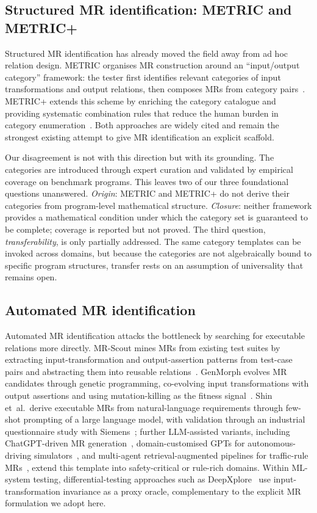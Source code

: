 \documentclass[acmsmall, screen]{acmart}
\begin{document}
\subsection{Structured MR identification: METRIC and METRIC+}

Structured MR identification has already moved the field away from ad hoc relation design. METRIC organises MR construction around an ``input/output category'' framework: the tester first identifies relevant categories of input transformations and output relations, then composes MRs from category pairs~\cite{ChenMETRIC2016}. METRIC+ extends this scheme by enriching the category catalogue and providing systematic combination rules that reduce the human burden in category enumeration~\cite{SunMETRICplus2021}. Both approaches are widely cited and remain the strongest existing attempt to give MR identification an explicit scaffold.

Our disagreement is not with this direction but with its grounding. The categories are introduced through expert curation and validated by empirical coverage on benchmark programs. This leaves two of our three foundational questions unanswered. \emph{Origin}: METRIC and METRIC+ do not derive their categories from program-level mathematical structure. \emph{Closure}: neither framework provides a mathematical condition under which the category set is guaranteed to be complete; coverage is reported but not proved. The third question, \emph{transferability}, is only partially addressed. The same category templates can be invoked across domains, but because the categories are not algebraically bound to specific program structures, transfer rests on an assumption of universality that remains open.

\subsection{Automated MR identification}

Automated MR identification attacks the bottleneck by searching for executable relations more directly. MR-Scout mines MRs from existing test suites by extracting input-transformation and output-assertion patterns from test-case pairs and abstracting them into reusable relations~\cite{MRScout2024}. GenMorph evolves MR candidates through genetic programming, co-evolving input transformations with output assertions and using mutation-killing as the fitness signal~\cite{GenMorph2024}. Shin et~al.\ derive executable MRs from natural-language requirements through few-shot prompting of a large language model, with validation through an industrial questionnaire study with Siemens~\cite{Shin2024}; further LLM-assisted variants, including ChatGPT-driven MR generation~\cite{ZhangChatGPTMR2023}, domain-customised GPTs for autonomous-driving simulators~\cite{GPTMR2025}, and multi-agent retrieval-augmented pipelines for traffic-rule MRs~\cite{AutoMT2025}, extend this template into safety-critical or rule-rich domains. Within ML-system testing, differential-testing approaches such as DeepXplore~\cite{DeepXplore2017} use input-transformation invariance as a proxy oracle, complementary to the explicit MR formulation we adopt here.
\end{document}
